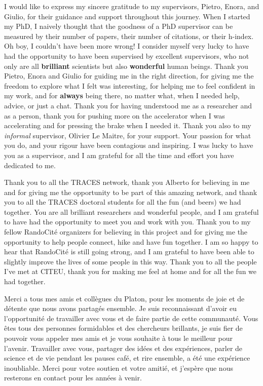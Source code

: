 %
\label{sec:acknowledgement}

I would like to express my sincere gratitude to my supervisors, Pietro, Enora, and Giulio, for their guidance and support throughout this journey. When I started my PhD, I naively thought that the goodness of a PhD supervisor can be measured by their number of papers, their number of citations, or their h-index. Oh boy, I couldn't have been more wrong! I consider myself very lucky to have had the opportunity to have been supervised by excellent supervisors, who not only are all \textbf{brilliant} scientists but also \textbf{wonderful} human beings. Thank you Pietro, Enora and Giulio for guiding me in the right direction, for giving me the freedom to explore what I felt was interesting, for helping me to feel confident in my work, and for \textbf{always} being there, no matter what, when I needed help, advice, or just a chat. Thank you for having understood me as a researcher and as a person, thank you for pushing more on the accelerator when I was accelerating and for pressing the brake when I needed it. Thank you also to my \textit{informal} supervisor, Olivier Le Maitre, for your support. Your passion for what you do, and your rigour have been contagious and inspiring. I was lucky to have you as a supervisor, and I am grateful for all the time and effort you have dedicated to me.

\smallskip
Thank you to all the TRACES network, thank you Alberto for believing in me and for giving me the opportunity to be part of this amazing network, and thank you to all the TRACES doctoral students for all the fun (and beers) we had together. You are all brilliant researchers and wonderful people, and I am grateful to have had the opportunity to meet you and work with you. 
\smallskip
Thank you to my fellow RandoCité organizers for believing in this project and for giving me the opportunity to help people connect, hike and have fun together. I am so happy to hear that RandoCité is still going strong, and I am grateful to have been able to slightly improve the lives of some people in this way. Thank you to all the people I've met at CITEU, thank you for making me feel at home and for all the fun we had together.

\smallskip
Merci a tous mes amis et collègues du Platon, pour les moments de joie et de détente que nous avons partagés ensemble. Je suis reconnaissant d'avoir eu l'opportunité de travailler avec vous et de faire partie de cette communauté. Vous êtes tous des personnes formidables et des chercheurs brillants, je suis fier de pouvoir vous appeler mes amis et je vous souhaite à tous le meilleur pour l'avenir. Travailler avec vous, partager des idées et des expériences, parler de science et de vie pendant les pauses café, et rire ensemble, a été une expérience inoubliable. Merci pour votre soutien et votre amitié, et j'espère que nous resterons en contact pour les années à venir.

